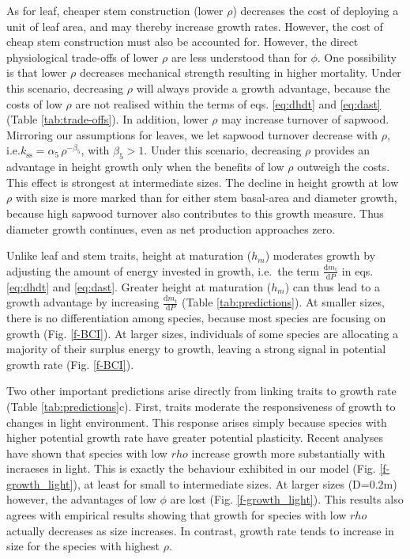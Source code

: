 \documentclass[12pt, a4paper]{article}
\begin{document}
As for leaf, cheaper stem construction (lower \(\rho\)) decreases the
cost of deploying a unit of leaf area, and may thereby increase growth
rates. However, the cost of cheap stem construction must also be
accounted for. However, the direct physiological trade-offs of lower
\(\rho\) are less understood than for \(\phi\). One possibility is that
lower \(\rho\) decreases mechanical strength resulting in higher
mortality\citep{chave-2009,wright-2010}. Under
this scenario, decreasing \(\rho\) will always provide a growth
advantage, because the costs of low \(\rho\) are not realised within the
terms of eqs. \ref{eq:dhdt} and \ref{eq:dast} (Table
\ref{tab:trade-offs}). In addition, lower \(\rho\) may increase turnover
of sapwood. Mirroring our assumptions for leaves, we let sapwood
turnover decrease with \(\rho\),
i.e.\(k_\textrm{ss}=\alpha_5 \, \rho^{-\beta_5}\), with \(\beta_5 > 1\).
Under this scenario, decreasing \(\rho\) provides an advantage in height
growth only when the benefits of low \(\rho\) outweigh the costs. This
effect is strongest at intermediate sizes. The decline in height growth
at low \(\rho\) with size is more marked than for either stem basal-area
and diameter growth, because high sapwood turnover also contributes to
this growth measure. Thus diameter growth continues, even as net
production approaches zero.

Unlike leaf and stem traits, height at maturation (\(h_m\)) moderates
growth by adjusting the amount of energy invested in growth, i.e.~the
term \(\frac{\textrm{d}m_\textrm{t}}{\textrm{d}P}\) in eqs.
\ref{eq:dhdt} and \ref{eq:dast}. Greater height at maturation (\(h_m\))
can thus lead to a growth advantage by increasing
\(\frac{\textrm{d}m_\textrm{t}}{\textrm{d}P}\) (Table
\ref{tab:predictions}). At smaller sizes, there is no differentiation
among species, because most species are focusing on growth (Fig.
\ref{f-BCI}). At larger sizes, individuals of some species are
allocating a majority of their surplus energy to growth, leaving a
strong signal in potential growth rate (Fig. \ref{f-BCI}).

Two other important predictions arise directly from linking traits to
growth rate (Table \ref{tab:predictions}c). First, traits moderate the
responsiveness of growth to changes in light environment. This response
arises simply because species with higher potential growth rate have
greater potential plasticity. Recent analyses have shown that species
with low \(rho\) increase growth more substantially with incraeses in
light\citep{ruger-2012}. This is exactly the behaviour
exhibited in our model (Fig. \ref{f-growth_light}), at least for small
to intermediate sizes. At larger sizes (D=0.2m) however, the advantages
of low \(\phi\) are lost (Fig. \ref{f-growth_light}). This results also
agrees with empirical results showing that growth for species with low
\(rho\) actually decreases as size
increases\citep{ruger-2012}. In contrast, growth rate tends
to increase in size for the species with highest
\(\rho\)\citep{ruger-2012}.
\end{document}
